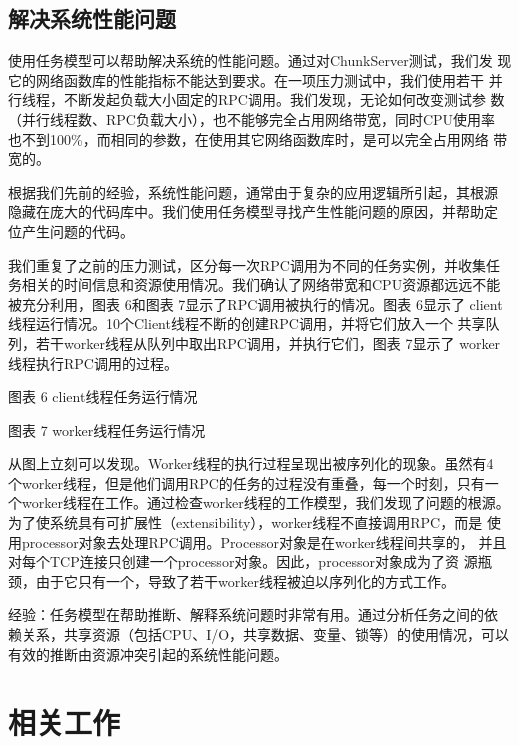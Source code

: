 \subsection{解决系统性能问题}

使用任务模型可以帮助解决系统的性能问题。通过对ChunkServer测试，我们发
现它的网络函数库的性能指标不能达到要求。在一项压力测试中，我们使用若干
并行线程，不断发起负载大小固定的RPC调用。我们发现，无论如何改变测试参
数（并行线程数、RPC负载大小），也不能够完全占用网络带宽，同时CPU使用率
也不到100\%，而相同的参数，在使用其它网络函数库时，是可以完全占用网络
带宽的。

根据我们先前的经验，系统性能问题，通常由于复杂的应用逻辑所引起，其根源
隐藏在庞大的代码库中。我们使用任务模型寻找产生性能问题的原因，并帮助定
位产生问题的代码。

我们重复了之前的压力测试，区分每一次RPC调用为不同的任务实例，并收集任
务相关的时间信息和资源使用情况。我们确认了网络带宽和CPU资源都远远不能
被充分利用，图表 6和图表 7显示了RPC调用被执行的情况。图表 6显示了
client线程运行情况。10个Client线程不断的创建RPC调用，并将它们放入一个
共享队列，若干worker线程从队列中取出RPC调用，并执行它们，图表 7显示了
worker线程执行RPC调用的过程。

 
图表 6 client线程任务运行情况

 
图表 7 worker线程任务运行情况

从图上立刻可以发现。Worker线程的执行过程呈现出被序列化的现象。虽然有4
个worker线程，但是他们调用RPC的任务的过程没有重叠，每一个时刻，只有一
个worker线程在工作。通过检查worker线程的工作模型，我们发现了问题的根源。
为了使系统具有可扩展性（extensibility），worker线程不直接调用RPC，而是
使用processor对象去处理RPC调用。Processor对象是在worker线程间共享的，
并且对每个TCP连接只创建一个processor对象。因此，processor对象成为了资
源瓶颈，由于它只有一个，导致了若干worker线程被迫以序列化的方式工作。

经验：任务模型在帮助推断、解释系统问题时非常有用。通过分析任务之间的依
赖关系，共享资源（包括CPU、I/O，共享数据、变量、锁等）的使用情况，可以
有效的推断由资源冲突引起的系统性能问题。



\section{相关工作}

